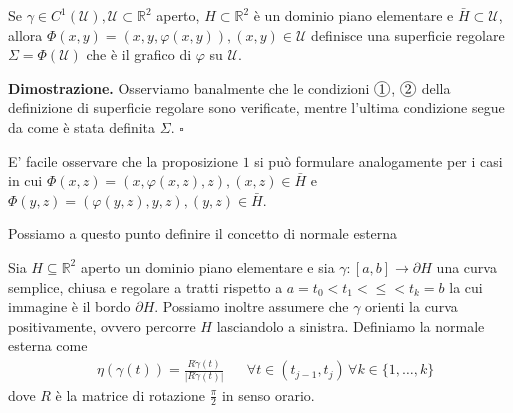%
\vspace{0.5cm}
\begin{prop}
	Se $\gamma \in C^1(\mathcal{U}), \mathcal{U} \subset \mathbb{R}^2$ aperto, $H \subset \mathbb{R}^2$ è un dominio piano elementare e $\bar{H} \subset \mathcal{U}$, allora $\Phi(x, y) = (x, y, \varphi(x, y)), (x, y) \in \mathcal{U}$ definisce una superficie regolare $\Sigma = \Phi(\mathcal{U})$ che è il grafico di $\varphi$ su $\mathcal{U}$.
\end{prop}
%
\noindent \textbf{Dimostrazione. }
Osserviamo banalmente che le condizioni $\circled{1}$, $\circled{2}$ della definizione di superficie regolare sono verificate, mentre l'ultima condizione segue da come è stata definita $\Sigma$.
\hfill $\square$
%
\begin{remark}
	E' facile osservare che la proposizione $1$ si può formulare analogamente per i casi in cui $\Phi(x, z) = (x, \varphi(x, z), z), (x, z) \in \bar{H}$ e $\Phi(y, z) = (\varphi(y, z), y, z), (y, z) \in \bar{H}$.
\end{remark}
%
Possiamo a questo punto definire il concetto di normale esterna
%
\vspace{0.5cm}
\begin{definition}[\textcolor{blue}{normale esterna}]
	Sia $H \subseteq \mathbb{R}^2$ aperto un dominio piano elementare e sia $\gamma : [a, b] \to \partial H$ una curva semplice, chiusa e regolare a tratti rispetto a $a = t_0 < t_1 < \leq < t_k = b$ la cui immagine è il bordo $\partial H$. Possiamo inoltre assumere che $\gamma$ orienti la curva positivamente, ovvero 
	percorre $H$ lasciandolo a sinistra. Definiamo la normale esterna come
	\[\begin{aligned}
	&\eta(\gamma(t)) = \frac{R\dot{\gamma}(t)}{|R\dot{\gamma}(t)|} & &\forall t \in (t_{j-1}, t_j) \, \forall k \in \{1, \ldots, k \}
	\end{aligned}\]
	dove $R$ è la matrice di rotazione $\frac{\pi}{2}$ in senso orario.
\end{definition}
%

